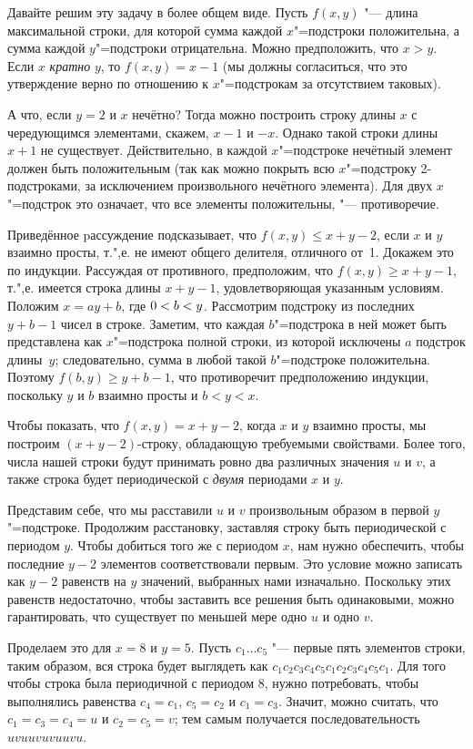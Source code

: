 \documentclass[twoside]{book}
\begin{document}
Давайте решим эту задачу в более общем виде.
Пусть $f(x,y)$ "--- длина максимальной строки, для которой сумма каждой $x$"=подстроки положительна, а сумма каждой $y$"=подстроки отрицательна.
Можно предположить, что $x>y$.
Если $x$ \emph{кратно} $y$, то $f(x,y)=x-1$ (мы должны согласиться, что это утверждение верно по отношению к $x$"=подстрокам за отсутствием таковых).

А что, если $y=2$ и $x$ нечётно?
Тогда можно построить строку длины $x$ с чередующимся элементами, скажем, $x-1$ и $-x$.
Однако такой строки длины $x+1$ не существует.
Действительно, в каждой $x$"=подстроке нечётный элемент должен быть положительным 
(так как можно покрыть всю $x$"=подстроку 2-подстроками, за исключением произвольного нечётного элемента).
Для двух $x$"=подстрок это означает, что все элементы положительны, "---
противоречие.

Приведённое pассуждение подсказывает, что $f(x,y)\le x+y-2$, если $x$ и $y$ взаимно просты, 
т.",е. не имеют общего делителя, отличного от~1.
Докажем это по индукции.
Рассуждая от противного, предположим, что $f(x,y)\ge x+y-1$,
т.",е. имеется строка длины $x+y-1$, удовлетворяющая указанным условиям.
Положим $x=ay+b$, где $0\z<b\z<y$.
Рассмотрим подстроку из последних $y+b-1$ чисел в строке.
Заметим, что каждая $b$"=подстрока в ней 
может быть представлена как $x$"=подстрока полной строки, 
из которой исключены $a$ подстрок длины~$y$; 
следовательно, сумма в любой такой $b$"=подстроке положительна.
Поэтому
$f(b,y)\ge y+b-1$,
что противоречит предположению индукции, поскольку $y$ и $b$ взаимно просты и $b<y<x$. %

Чтобы показать, что $f(x,y)=x+y-2$, когда $x$ и $y$ взаимно просты, мы построим $(x+y-2)$-строку, обладающую требуемыми свойствами.
Более того, числа нашей строки будут принимать ровно два различных значения $u$ и $v$,
а также строка будет периодической с \emph{двумя} периодами $x$ и $y$.

Представим себе, что мы расставили $u$ и $v$ произвольным образом в первой $y$"=подстроке.
Продолжим расстановку, заставляя строку быть периодической с периодом $y$.
Чтобы добиться того же с периодом $x$,
нам нужно обеспечить, чтобы последние $y-2$ элементов соответствовали первым.
Это условие можно записать как $y-2$ равенств на $y$ значений, выбранных нами изначально.
Поскольку этих равенств недостаточно, чтобы заставить все решения быть одинаковыми, можно гарантировать, что существует по меньшей мере одно $u$ и одно $v$.

Проделаем это для $x=8$ и $y=5$.
Пусть $c_1\dots c_5$ "--- первые пять элементов строки, 
таким образом, вся строка будет выглядеть как
$c_1c_2c_3c_4c_5c_1c_2c_3c_4c_5c_1$.
Для того чтобы строка была периодичной с периодом 8, 
нужно потребовать, чтобы выполнялись равенства $c_4=c_1$, $c_5=c_2$ и $c_1=c_3$.
Значит, можно считать, что $c_1=c_3=c_4=u$ и $c_2=c_5=v$; 
тем самым получается последовательность $uvuuvuvuuvu$.
\end{document}
